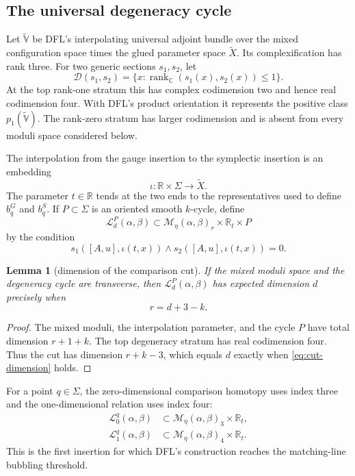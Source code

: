 \documentclass[11pt]{amsart}
\newtheorem{lemma}[theorem]{Lemma}
\theoremstyle{definition}
\theoremstyle{remark}
\theoremstyle{plain}
\newcommand{\RR}{\mathbb{R}}
\newcommand{\CC}{\mathbb{C}}
\newcommand{\cL}{\mathcal{L}}
\newcommand{\cM}{\mathcal{M}}
\newcommand{\rank}{\operatorname{rank}}
\begin{document}
\subsection{The universal degeneracy cycle}\label{sec:degeneracy}
Let $\widetilde{\mathbb V}$ be DFL's interpolating universal adjoint
bundle over the mixed configuration space times the glued parameter space
$\widetilde X$.  Its complexification has rank three.  For two generic
sections $s_1,s_2$, let
\[
 \mathscr D(s_1,s_2)
 =\{x:\rank_\CC(s_1(x),s_2(x))\leq1\}.
\]
At the top rank-one stratum this has complex codimension two and hence
real codimension four.  With DFL's product orientation it represents the
positive class $p_1(\widetilde{\mathbb V})$.  The rank-zero stratum has
larger codimension and is absent from every moduli space considered below.

The interpolation from the gauge insertion to the symplectic insertion is
an embedding
\[
                    \iota:\RR\times\Sigma\longrightarrow\widetilde X.
\]
The parameter $t\in\RR$ tends at the two ends to the representatives used
to define $b_q^G$ and $b_q^S$.  If $P\subset\Sigma$ is an oriented smooth
$k$-cycle, define
\[
 \cL_d^P(\alpha,\beta)
 \subset \cM_\eta(\alpha,\beta)_r\times\RR_t\times P
\]
by the condition
\[
 s_1([A,u],\iota(t,x))\wedge
 s_2([A,u],\iota(t,x))=0.
\]

\begin{lemma}[dimension of the comparison cut]\label{lem:cut-dimension}
If the mixed moduli space and the degeneracy cycle are transverse, then
$\cL_d^P(\alpha,\beta)$ has expected dimension $d$ precisely when
\begin{equation}\label{eq:cut-dimension}
                              r=d+3-k.
\end{equation}
\end{lemma}

\begin{proof}
The mixed moduli, the interpolation parameter, and the cycle $P$ have
total dimension $r+1+k$.  The top degeneracy stratum has real codimension
four.  Thus the cut has dimension $r+k-3$, which equals $d$ exactly when
\eqref{eq:cut-dimension} holds.
\end{proof}

For a point $q\in\Sigma$, the zero-dimensional comparison homotopy uses
index three and the one-dimensional relation uses index four:
\begin{equation}\label{eq:point-cuts}
 \begin{aligned}
 \cL_0^q(\alpha,\beta)
 &\subset\cM_\eta(\alpha,\beta)_3\times\RR_t,\\
 \cL_1^q(\alpha,\beta)
 &\subset\cM_\eta(\alpha,\beta)_4\times\RR_t.
 \end{aligned}
\end{equation}
This is the first insertion for which DFL's construction reaches the
matching-line bubbling threshold.
\end{document}
